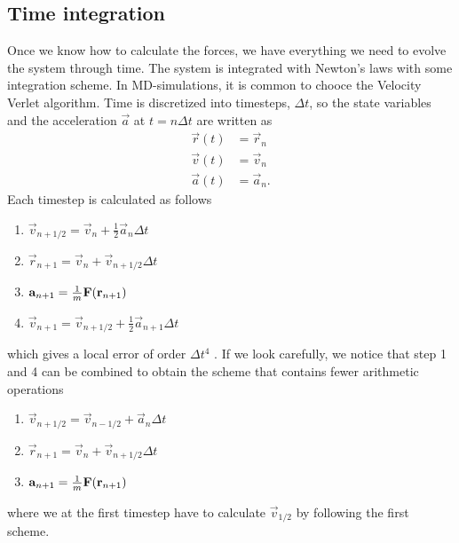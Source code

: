 \subsection{Time integration}
Once we know how to calculate the forces, we have everything we need to evolve the system through time. The system is integrated with Newton's laws with some integration scheme. In MD-simulations, it is common to chooce the Velocity Verlet algorithm. Time is discretized into timesteps, $\Delta t$, so the state variables and the acceleration $\vec a$ at $t=n\Delta t$ are written as
\begin{align*}
	\vec r(t) & = \vec r_n\\
	\vec v(t) & = \vec v_n\\
	\vec a(t) & = \vec a_n.
\end{align*}
Each timestep is calculated as follows
\begin{enumerate}
	\item $\vec v_{n+1/2} = \vec v_{n} + \frac{1}{2}\vec a_{n}\Delta t$
	\item $\vec r_{n+1} = \vec v_{n} + \vec v_{n+1/2}\Delta t$
	\item $\vec a_{n+1} = {1\over m}\vec F(\vec r_{n+1})$
	\item $\vec v_{n+1}   = \vec v_{n+1/2} + \frac{1}{2}\vec a_{n+1}\Delta t$
\end{enumerate}
which gives a local error of order $\Delta t^4$ \cite{allen1989computer}. If we look carefully, we notice that step 1 and 4 can be combined to obtain the scheme that contains fewer arithmetic operations
\begin{enumerate}
	\item $\vec v_{n+1/2} = \vec v_{n-1/2} + \vec a_{n}\Delta t$
	\item $\vec r_{n+1} = \vec v_{n} + \vec v_{n+1/2}\Delta t$
	\item $\vec a_{n+1} = {1\over m}\vec F(\vec r_{n+1})$
\end{enumerate}
where we at the first timestep have to calculate $\vec v_{1/2}$ by following the first scheme.


